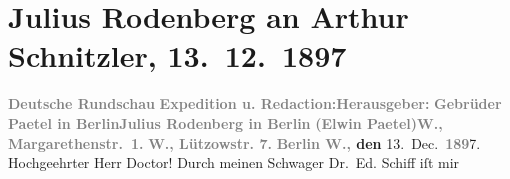

         
         \renewcommand{\erwaehntePersonen}{Personen: Elwin Paetel, Eduard Liberius Schiff}
         \renewcommand{\erwaehnteInstitutionen}{Institutionen: Deutsche Rundschau, Gebrüder Paetel Verlag}
         \renewcommand{\erwaehnteOrte}{Orte: Berlin, Lützowstraße, Margaretenstraße, Wien}
         \renewcommand{\erwaehnteWerke}{}
               \section[Julius Rodenberg an Arthur Schnitzler, 13. 12. 1897]{ Julius Rodenberg an Arthur Schnitzler, 13. 12. 1897}\nopagebreak{}\rehead{ }\begin{ledgroupsized}[t]{13cm}\normalsize\beginnumbering \toendnotes[C]{\smallbreak\pagebreak[2]} 
\pstart
           \noindent{}\centering{}{\pb}\textcolor{gray}{\textbf{Deutsche Rundschau}}\pend
           \pstart
           \noindent{}\textcolor{gray}{\textbf{Expedition u. Redaction:}}\hfill \textcolor{gray}{\textbf{Herausgeber:}}\pend
           \pstart
           \textcolor{gray}{\textbf{Gebrüder Paetel in Berlin}}\hfill \textcolor{gray}{\textbf{Julius Rodenberg in Berlin}}\pend
           \pstart
           \textcolor{gray}{\textbf{(Elwin
                                Paetel)}}\hfill \textcolor{gray}{\textbf{W., Margarethenstr. 1.}}\pend
           \pstart
           \textcolor{gray}{\textbf{W., Lützowstr. 7.}}\pend
           \pstart
           \raggedleft{}\textbf{\textcolor{gray}{\textbf{Berlin W.,}} den}{ }13. Dec. \textcolor{gray}{\textbf{189}}7.\pend
           \pstart{}Hochgeehrter Herr Doctor!\pend\pstart
           Durch meinen Schwager Dr. Ed. Schiff iſt mir

\end{ledgroupsized}
